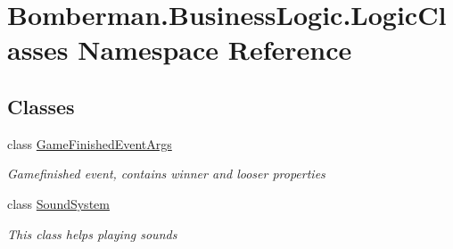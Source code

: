 \hypertarget{namespace_bomberman_1_1_business_logic_1_1_logic_classes}{}\section{Bomberman.\+Business\+Logic.\+Logic\+Classes Namespace Reference}
\label{namespace_bomberman_1_1_business_logic_1_1_logic_classes}
\subsection*{Classes}
\begin{DoxyCompactItemize}
\item 
class \mbox{\hyperlink{class_bomberman_1_1_business_logic_1_1_logic_classes_1_1_game_finished_event_args}{Game\+Finished\+Event\+Args}}
\begin{DoxyCompactList}\small\item\em Gamefinished event, contains winner and looser properties \end{DoxyCompactList}\item 
class \mbox{\hyperlink{class_bomberman_1_1_business_logic_1_1_logic_classes_1_1_sound_system}{Sound\+System}}
\begin{DoxyCompactList}\small\item\em This class helps playing sounds \end{DoxyCompactList}\end{DoxyCompactItemize}
